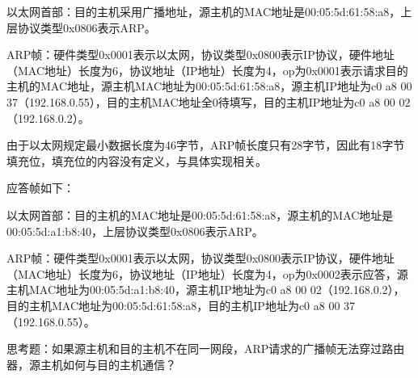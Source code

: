以太网首部：目的主机采用广播地址，源主机的MAC地址是00:\BookSplit{}05:\BookSplit{}5d:\BookSplit{}61:\BookSplit{}58:\BookSplit{}a8，上层协议类型0x0806表示ARP。



ARP帧：硬件类型0x0001表示以太网，协议类型0x0800表示IP协议，硬件地址（MAC地址）长度为6，协议地址（IP地址）长度为4，op为0x0001表示请求目的主机的MAC地址，源主机MAC地址为00:\BookSplit{}05:\BookSplit{}5d:\BookSplit{}61:\BookSplit{}58:\BookSplit{}a8，源主机IP地址为c0 a8 00 37（192.\BookSplit{}168.\BookSplit{}0.\BookSplit{}55），目的主机MAC地址全0待填写，目的主机IP地址为c0 a8 00 02（192.\BookSplit{}168.\BookSplit{}0.\BookSplit{}2）。



由于以太网规定最小数据长度为46字节，ARP帧长度只有28字节，因此有18字节填充位，填充位的内容没有定义，与具体实现相关。



应答帧如下：


\begin{BookLiteral}
\end{BookLiteral}


以太网首部：目的主机的MAC地址是00:\BookSplit{}05:\BookSplit{}5d:\BookSplit{}61:\BookSplit{}58:\BookSplit{}a8，源主机的MAC地址是00:\BookSplit{}05:\BookSplit{}5d:\BookSplit{}a1:\BookSplit{}b8:\BookSplit{}40，上层协议类型0x0806表示ARP。



ARP帧：硬件类型0x0001表示以太网，协议类型0x0800表示IP协议，硬件地址（MAC地址）长度为6，协议地址（IP地址）长度为4，op为0x0002表示应答，源主机MAC地址为00:\BookSplit{}05:\BookSplit{}5d:\BookSplit{}a1:\BookSplit{}b8:\BookSplit{}40，源主机IP地址为c0 a8 00 02（192.\BookSplit{}168.\BookSplit{}0.\BookSplit{}2），目的主机MAC地址为00:\BookSplit{}05:\BookSplit{}5d:\BookSplit{}61:\BookSplit{}58:\BookSplit{}a8，目的主机IP地址为c0 a8 00 37（192.\BookSplit{}168.\BookSplit{}0.\BookSplit{}55）。



思考题：如果源主机和目的主机不在同一网段，ARP请求的广播帧无法穿过路由器，源主机如何与目的主机通信？

